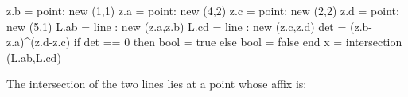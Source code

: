 \begin{tkzelements}
z.b = point:  new (1,1)
z.a = point:  new (4,2)
z.c = point:  new (2,2)
z.d = point:  new (5,1)
L.ab = line : new (z.a,z.b)
L.cd = line : new (z.c,z.d)
det = (z.b-z.a)^(z.d-z.c)
if det == 0 then bool = true 
  else bool = false
end
x = intersection (L.ab,L.cd)
\end{tkzelements}

The intersection of the two lines lies at
a point whose affix is: 

\vspace{1em}
\hspace{\fill}
  \hspace{\fill} 

\endinput